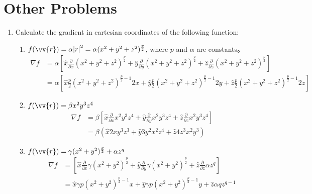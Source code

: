 \documentclass{article}
\begin{document}
\section{Other Problems}
\begin{enumerate}
    \item Calculate the gradient in cartesian coordinates of the following function:
    \begin{enumerate}
        \item $f(\vv{r}) = \alpha\abs{r}^2 = \alpha(x^2+y^2+z^2)^{\frac{p}{2}}$, where $p$ and $\alpha$ are constants。
        \begin{align*}
        \nabla f &= \alpha \left[\hat{x}\frac{\partial}{\partial x} (x^2+y^2+z^2)^{\frac{p}{2}} + \hat{y}\frac{\partial}{\partial y} (x^2+y^2+z^2)^{\frac{p}{2}} + \hat{z}\frac{\partial}{\partial z} (x^2+y^2+z^2)^{\frac{p}{2}}\right]\\
        &= \alpha \left[\hat{x}\frac{p}{2}(x^2+y^2+z^2)^{\frac{p}{2}-1}2x + \hat{y}\frac{p}{2}(x^2+y^2+z^2)^{\frac{p}{2}-1}2y + \hat{z}\frac{p}{2}(x^2+y^2+z^2)^{\frac{p}{2}-1}2z\right]
        \end{align*}

        \item $f(\vv{r}) = \beta x^2y^3z^4$
        \begin{align*}
        \nabla f &= \beta \left[\hat{x}\frac{\partial}{\partial x} x^2y^3z^4 + \hat{y}\frac{\partial}{\partial y} x^2y^3z^4 + \hat{z}\frac{\partial}{\partial z} x^2y^3z^4\right]\\
        &= \beta (\hat{x}2xy^3z^3 + \hat{y}3y^2x^2z^4+\hat{z}4z^3x^2y^3)
        \end{align*}

        \item $f(\vv{r}) = \gamma (x^2+y^2)^{\frac{p}{2}}+\alpha z^q$
        \begin{align*}
        \nabla f &= \left[\hat{x}\frac{\partial}{\partial x} \gamma (x^2+y^2)^{\frac{p}{2}} + \hat{y}\frac{\partial}{\partial y} \gamma (x^2+y^2)^{\frac{p}{2}} + \hat{z}\frac{\partial}{\partial z} \alpha z^q\right] \\
        &=\hat{x}\gamma p(x^2+y^2)^{\frac{p}{2}-1}x+ \hat{y}\gamma p(x^2+y^2)^{\frac{p}{2}-1}y +\hat{z}\alpha q z^{q-1}
        \end{align*}
    \end{enumerate}



\end{enumerate}
\end{document}

